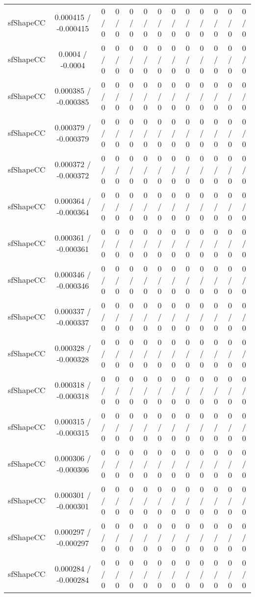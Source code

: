 \documentclass[10pt]{article}
\begin{document}
\begin{table}[htbp]
\begin{center}
\begin{tabular}{|c|c|c|c|c|c|c|c|c|c|c|c|c|}
  sfShapeCC & 0.000415 / -0.000415 & 0 / 0 & 0 / 0 & 0 / 0 & 0 / 0 & 0 / 0 & 0 / 0 & 0 / 0 & 0 / 0 & 0 / 0 & 0 / 0 & 0 / 0 \\ 
  sfShapeCC & 0.0004 / -0.0004 & 0 / 0 & 0 / 0 & 0 / 0 & 0 / 0 & 0 / 0 & 0 / 0 & 0 / 0 & 0 / 0 & 0 / 0 & 0 / 0 & 0 / 0 \\ 
  sfShapeCC & 0.000385 / -0.000385 & 0 / 0 & 0 / 0 & 0 / 0 & 0 / 0 & 0 / 0 & 0 / 0 & 0 / 0 & 0 / 0 & 0 / 0 & 0 / 0 & 0 / 0 \\ 
  sfShapeCC & 0.000379 / -0.000379 & 0 / 0 & 0 / 0 & 0 / 0 & 0 / 0 & 0 / 0 & 0 / 0 & 0 / 0 & 0 / 0 & 0 / 0 & 0 / 0 & 0 / 0 \\ 
  sfShapeCC & 0.000372 / -0.000372 & 0 / 0 & 0 / 0 & 0 / 0 & 0 / 0 & 0 / 0 & 0 / 0 & 0 / 0 & 0 / 0 & 0 / 0 & 0 / 0 & 0 / 0 \\ 
  sfShapeCC & 0.000364 / -0.000364 & 0 / 0 & 0 / 0 & 0 / 0 & 0 / 0 & 0 / 0 & 0 / 0 & 0 / 0 & 0 / 0 & 0 / 0 & 0 / 0 & 0 / 0 \\ 
  sfShapeCC & 0.000361 / -0.000361 & 0 / 0 & 0 / 0 & 0 / 0 & 0 / 0 & 0 / 0 & 0 / 0 & 0 / 0 & 0 / 0 & 0 / 0 & 0 / 0 & 0 / 0 \\ 
  sfShapeCC & 0.000346 / -0.000346 & 0 / 0 & 0 / 0 & 0 / 0 & 0 / 0 & 0 / 0 & 0 / 0 & 0 / 0 & 0 / 0 & 0 / 0 & 0 / 0 & 0 / 0 \\ 
  sfShapeCC & 0.000337 / -0.000337 & 0 / 0 & 0 / 0 & 0 / 0 & 0 / 0 & 0 / 0 & 0 / 0 & 0 / 0 & 0 / 0 & 0 / 0 & 0 / 0 & 0 / 0 \\ 
  sfShapeCC & 0.000328 / -0.000328 & 0 / 0 & 0 / 0 & 0 / 0 & 0 / 0 & 0 / 0 & 0 / 0 & 0 / 0 & 0 / 0 & 0 / 0 & 0 / 0 & 0 / 0 \\ 
  sfShapeCC & 0.000318 / -0.000318 & 0 / 0 & 0 / 0 & 0 / 0 & 0 / 0 & 0 / 0 & 0 / 0 & 0 / 0 & 0 / 0 & 0 / 0 & 0 / 0 & 0 / 0 \\ 
  sfShapeCC & 0.000315 / -0.000315 & 0 / 0 & 0 / 0 & 0 / 0 & 0 / 0 & 0 / 0 & 0 / 0 & 0 / 0 & 0 / 0 & 0 / 0 & 0 / 0 & 0 / 0 \\ 
  sfShapeCC & 0.000306 / -0.000306 & 0 / 0 & 0 / 0 & 0 / 0 & 0 / 0 & 0 / 0 & 0 / 0 & 0 / 0 & 0 / 0 & 0 / 0 & 0 / 0 & 0 / 0 \\ 
  sfShapeCC & 0.000301 / -0.000301 & 0 / 0 & 0 / 0 & 0 / 0 & 0 / 0 & 0 / 0 & 0 / 0 & 0 / 0 & 0 / 0 & 0 / 0 & 0 / 0 & 0 / 0 \\ 
  sfShapeCC & 0.000297 / -0.000297 & 0 / 0 & 0 / 0 & 0 / 0 & 0 / 0 & 0 / 0 & 0 / 0 & 0 / 0 & 0 / 0 & 0 / 0 & 0 / 0 & 0 / 0 \\ 
  sfShapeCC & 0.000284 / -0.000284 & 0 / 0 & 0 / 0 & 0 / 0 & 0 / 0 & 0 / 0 & 0 / 0 & 0 / 0 & 0 / 0 & 0 / 0 & 0 / 0 & 0 / 0 \\ 

\end{tabular}
\end{center}
\end{table}
\end{document}
